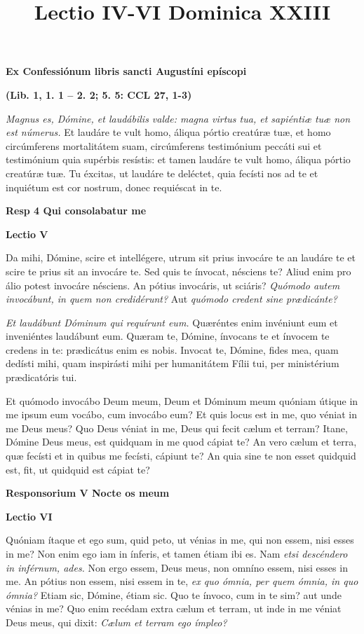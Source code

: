 \documentclass[options]{article}
\title{Lectio IV-VI Dominica XXIII}
\begin{document}
	\textbf{Ex Confessiónum libris sancti Augustíni epíscopi}
	
	\textbf{(Lib. 1, 1. 1 – 2. 2; 5. 5: CCL 27, 1-3)}
	
	
	\textit{Magnus es, Dómine, et laudábilis valde: magna virtus tua, et sapiéntiæ tuæ non est númerus.}
	Et laudáre te vult homo, áliqua pórtio creatúræ tuæ, et homo circúmferens mortalitátem suam, circúmferens testimónium peccáti sui et testimónium quia supérbis resístis: et tamen laudáre te vult homo, áliqua pórtio creatúræ tuæ. Tu éxcitas, ut laudáre te deléctet, quia fecísti nos ad te et inquiétum est cor nostrum, donec requiéscat in te.
	
	
	\textbf{Resp 4 Qui consolabatur me}
	
	
	\textbf{Lectio V}
	
	
 Da mihi, Dómine, scire et intellégere, utrum sit prius invocáre te an laudáre te et scire te prius sit an invocáre te. Sed quis te ínvocat, nésciens te? Aliud enim pro álio potest invocáre nésciens. An pótius invocáris, ut sciáris? 
	\textit{Quómodo autem invocábunt, in quem non credidérunt?}
	Aut
	\textit{quómodo credent sine prædicánte?}
	
	\textit{Et laudábunt Dóminum qui requírunt eum.}
	Quæréntes enim invéniunt eum et inveniéntes laudábunt eum. Quæram te, Dómine, ínvocans te et ínvocem te credens in te: prædicátus enim es nobis. Invocat te, Dómine, fides mea, quam dedísti mihi, quam inspirásti mihi per humanitátem Fílii tui, per ministérium prædicatóris tui.
	
	Et quómodo invocábo Deum meum, Deum et Dóminum meum quóniam útique in me ipsum eum vocábo, cum invocábo eum? Et quis locus est in me, quo véniat in me Deus meus? Quo Deus véniat in me, Deus qui fecit cælum et terram? Itane, Dómine Deus meus, est quidquam in me quod cápiat te? An vero cælum et terra, quæ fecísti et in quibus me fecísti, cápiunt te? An quia sine te non esset quidquid est, fit, ut quidquid est cápiat te?
		
	\textbf{Responsorium V    Nocte os meum}
	
	\textbf{Lectio VI}
	
 Quóniam ítaque et ego sum, quid peto, ut vénias in me, qui non essem, nisi esses in me? Non enim ego iam in ínferis, et tamen étiam ibi es. Nam  
	\textit{etsi descéndero in inférnum, ades.}
	Non ergo essem, Deus meus, non omníno essem, nisi esses in me. An pótius non essem, nisi essem in te, 
	\textit{ex quo ómnia, per quem ómnia, in quo ómnia?}
	Etiam sic, Dómine, étiam sic. Quo te ínvoco, cum in te sim? aut unde vénias in me? Quo enim recédam extra cælum et terram, ut inde in me véniat Deus meus, qui dixit: 
	\textit{Cælum et terram ego ímpleo?}
	
\end{document}

